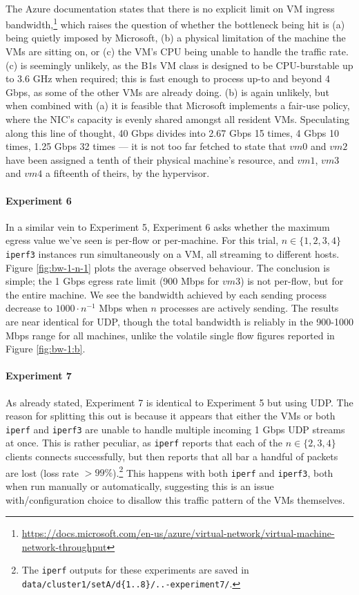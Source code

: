 \documentclass[a4paper,10pt]{article}
\begin{document}
\paragraph{} The Azure documentation states that there is no explicit limit on VM ingress bandwidth,\footnote{\url{https://docs.microsoft.com/en-us/azure/virtual-network/virtual-machine-network-throughput}} which raises the question of whether the bottleneck being hit is (a) being quietly imposed by Microsoft, (b) a physical limitation of the machine the VMs are sitting on, or (c) the VM's CPU being unable to handle the traffic rate. (c) is seemingly unlikely, as the B1s VM class is designed to be CPU-burstable up to 3.6 GHz when required; this is fast enough to process up-to and beyond 4 Gbps, as some of the other VMs are already doing. (b) is again unlikely, but when combined with (a) it is feasible that Microsoft implements a fair-use policy, where the NIC's capacity is evenly shared amongst all resident VMs. Speculating along this line of thought, 40 Gbps divides into 2.67 Gbps 15 times, 4 Gbps 10 times, 1.25 Gbps 32 times --- it is not too far fetched to state that $vm0$ and $vm2$ have been assigned a tenth of their physical machine's resource, and $vm1$, $vm3$ and $vm4$ a fifteenth of theirs, by the hypervisor.

\paragraph{Experiment 6} In a similar vein to Experiment 5, Experiment 6 asks whether the maximum egress value we've seen is per-flow or per-machine. For this trial, $n \in \{1,2,3,4\}$ \texttt{iperf3} instances run simultaneously on a VM, all streaming to different hosts. Figure \ref{fig:bw-1-n-1} plots the average observed behaviour. The conclusion is simple; the 1 Gbps egress rate limit (900 Mbps for $vm3$) is not per-flow, but for the entire machine. We see the bandwidth achieved by each sending process decrease to $1000 \cdot n^{-1}$ Mbps when $n$ processes are actively sending. The results are near identical for UDP, though the total bandwidth is reliably in the 900-1000 Mbps range for all machines, unlike the volatile single flow figures reported in Figure \ref{fig:bw-1:b}. 

\paragraph{Experiment 7} As already stated, Experiment 7 is identical to Experiment 5 but using UDP. The reason for splitting this out is because it appears that either the VMs or both \texttt{iperf} and \texttt{iperf3} are unable to handle multiple incoming 1 Gbps UDP streams at once. This is rather peculiar, as \texttt{iperf} reports that each of the $n \in \{2,3,4\}$ clients connects successfully, but then reports that all bar a handful of packets are lost (loss rate $\gt 99\%$).\footnote{The \texttt{iperf} outputs for these experiments are saved in \texttt{data/cluster1/setA/d\{1..8\}/..-experiment7/}.} This happens with both \texttt{iperf} and \texttt{iperf3}, both when run manually or automatically, suggesting this is an issue with/configuration choice to disallow this traffic pattern of the VMs themselves.
\end{document}
